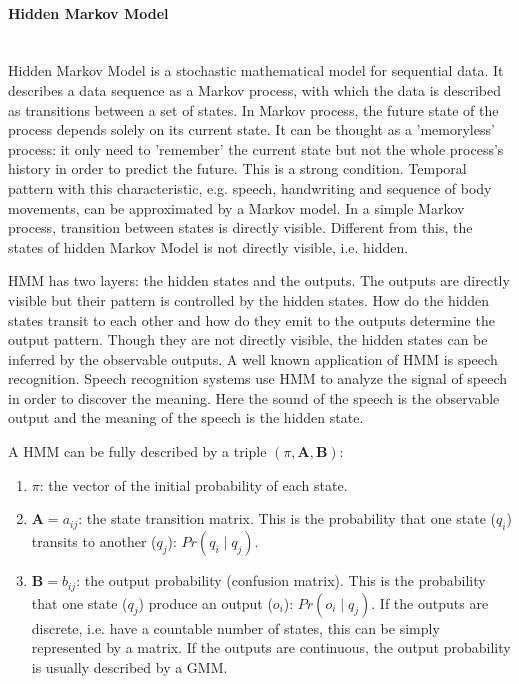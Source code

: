 \paragraph{Hidden Markov Model} ~\\
Hidden Markov Model is a stochastic mathematical model for sequential data. It describes a data sequence as a Markov process, with which the data is described as transitions between a set of states. In Markov process, the future state of the process depends solely on its current state. It can be thought as a 'memoryless' process: it only need to 'remember' the current state but not the whole process's history in order to predict the future. This is a strong condition. Temporal pattern with this characteristic, e.g. speech, handwriting and sequence of body movements, can be approximated by a Markov model. In a simple Markov process, transition between states is directly visible. Different from this, the states of hidden Markov Model is not directly visible, i.e. hidden.

HMM has two layers: the hidden states and the outputs. The outputs are directly visible but their pattern is controlled by the hidden states. How do the hidden states transit to each other and how do they emit to the outputs determine the output pattern. Though they are not directly visible, the hidden states can be inferred by the observable outputs. A well known application of HMM is speech recognition. Speech recognition systems use HMM to analyze the signal of speech in order to discover the meaning. Here the sound of the speech is the observable output and the meaning of the speech is the hidden state.


A HMM can be fully described by a triple $\left(\pi,\boldsymbol{A},\boldsymbol{B}\right)$:

\begin{enumerate}
\item $\pi$: the vector of the initial probability of each state.
\item $\boldsymbol{A}={a_{ij}}$: the state transition matrix. This is the probability that one state ($q_i$) transits to another ($q_j$): $Pr\left(q_i{\mid}q_j\right)$.
\item $\boldsymbol{B}={b_{ij}}$: the output probability (confusion matrix). This is the probability that one state ($q_j$) produce an output ($o_i$): $Pr\left(o_i{\mid}q_{j}\right)$. If the outputs are discrete, i.e. have a countable number of states, this can be simply represented by a matrix. If the outputs are continuous, the output probability is usually described by a GMM.
\end{enumerate}

